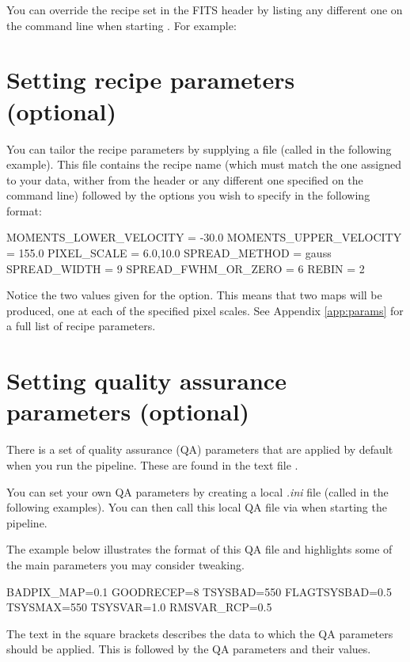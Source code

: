 \documentclass[11pt,oneside,chapters]{starlink}
\begin{document}
You can override the recipe set in the FITS header by listing any different
one on the command line when starting \oracdr. For example:
\begin{terminalv}
\end{terminalv}

\section{Setting recipe parameters (optional)}
\label{sec:recpars}

You can tailor the recipe parameters by supplying a  file
(called  in the following example). This file contains the
recipe name (which must match the one assigned to your data, wither
from the header or any different one specified on the command line)
followed by the options you wish to specify in the following format:

\vspace{0.2cm}
\begin{terminalv}
MOMENTS_LOWER_VELOCITY = -30.0
MOMENTS_UPPER_VELOCITY = 155.0
PIXEL_SCALE = 6.0,10.0
SPREAD_METHOD = gauss
SPREAD_WIDTH = 9
SPREAD_FWHM_OR_ZERO = 6
REBIN = 2
\end{terminalv}

Notice the two values given for the  option. This
means that two maps will be produced, one at each of the specified
pixel scales. See Appendix \ref{app:params} for a full list of recipe
parameters.


\section{Setting quality assurance parameters (optional)}
\label{sec:qa}

There is a set of quality assurance (QA) parameters that are applied
by default when you run the pipeline. These are found in the text file
.

You can set your own QA parameters by creating a local \textit{.ini}
file (called  in the following examples). You can then call
this local QA file via  when starting
the pipeline.

The example below illustrates the format of this QA file and
highlights some of the main parameters you may consider tweaking.

\vspace{0.2cm}
\begin{terminalv}
[default]
BADPIX_MAP=0.1
GOODRECEP=8
TSYSBAD=550
FLAGTSYSBAD=0.5
TSYSMAX=550
TSYSVAR=1.0
RMSVAR_RCP=0.5
\end{terminalv}
The text in the square brackets describes the data to which the QA
parameters should be applied. This is followed by the QA parameters
and their values.
\end{document}
